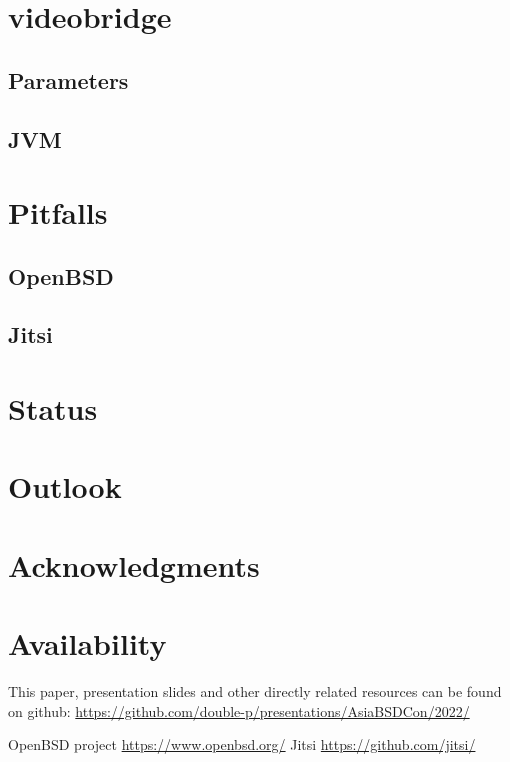 \documentclass[conference]{IEEEtran}
\begin{document}
\section{videobridge}
\subsection{Parameters}
\subsection{JVM}
\section{Pitfalls}
\subsection{OpenBSD}
\subsection{Jitsi}
\section{Status}
\section{Outlook}
\section{Acknowledgments}







\section{Availability}
This paper, presentation slides and other directly related resources can be found on github:
\url{https://github.com/double-p/presentations/AsiaBSDCon/2022/}


\begin{thebibliography}{00}
 OpenBSD project \url{https://www.openbsd.org/}
 Jitsi \url{https://github.com/jitsi/}

\end{thebibliography}
\end{document}
